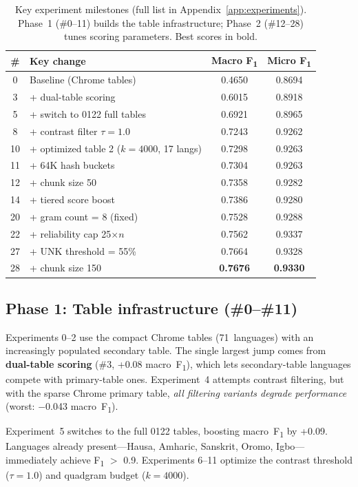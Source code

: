 \documentclass{article}
\newcommand{\fone}{F\textsubscript{1}}
\begin{document}
\begin{table}[t]
\centering
\small
\begin{tabular}{@{}clcc@{}}
\toprule
\# & Key change & Macro \fone{} & Micro \fone{} \\
\midrule
0 & Baseline (Chrome tables) & 0.4650 & 0.8694 \\
3 & + dual-table scoring & 0.6015 & 0.8918 \\
5 & + switch to 0122 full tables & 0.6921 & 0.8965 \\
8 & + contrast filter $\tau{=}1.0$ & 0.7243 & 0.9262 \\
10 & + optimized table 2 ($k{=}4000$, 17 langs) & 0.7298 & 0.9263 \\
\midrule
11 & + 64K hash buckets & 0.7304 & 0.9263 \\
12 & + chunk size 50 & 0.7358 & 0.9282 \\
14 & + tiered score boost & 0.7386 & 0.9280 \\
20 & + gram count = 8 (fixed) & 0.7528 & 0.9288 \\
22 & + reliability cap 25$\times n$ & 0.7562 & 0.9337 \\
27 & + UNK threshold = 55\% & 0.7664 & 0.9328 \\
28 & + chunk size 150 & \textbf{0.7676} & \textbf{0.9330} \\
\bottomrule
\end{tabular}
\caption{Key experiment milestones (full list in Appendix~\ref{app:experiments}). Phase~1 (\#0--11) builds the table infrastructure; Phase~2 (\#12--28) tunes scoring parameters. Best scores in bold.}
\label{tab:progress}
\end{table}

\subsection{Phase 1: Table infrastructure (\#0--\#11)}

Experiments 0--2 use the compact Chrome tables (71~languages) with an increasingly populated secondary table.
The single largest jump comes from \textbf{dual-table scoring} (\#3, +0.08 macro~\fone{}), which lets secondary-table languages compete with primary-table ones.
Experiment~4 attempts contrast filtering, but with the sparse Chrome primary table, \emph{all filtering variants degrade performance} (worst: $-$0.043 macro~\fone{}).

Experiment~5 switches to the full 0122 tables, boosting macro~\fone{} by +0.09.
Languages already present---Hausa, Amharic, Sanskrit, Oromo, Igbo---immediately achieve \fone{} $>$ 0.9.
Experiments 6--11 optimize the contrast threshold ($\tau{=}1.0$) and quadgram budget ($k{=}4000$).
\end{document}

